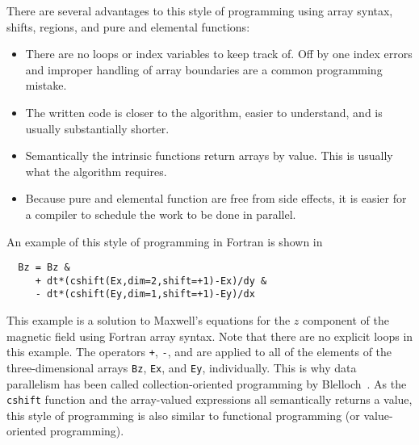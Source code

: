 

There are several advantages to this style of programming using array
syntax, shifts, regions, and pure and elemental functions:

\begin{itemize}
\item There are no loops or index variables to keep track of.  Off by
  one index errors and improper handling of array boundaries are a
  common programming mistake.
\item The written code is closer to the algorithm, easier to
  understand, and is usually substantially shorter.
\item Semantically the intrinsic functions return arrays by value.
  This is usually what the algorithm requires.
\item Because pure and elemental function are free from side effects,
  it is easier for a compiler to schedule the work to be done in
  parallel.
\end{itemize}


An example of this style of programming in Fortran is shown in

{\small
\begin{verbatim}
  Bz = Bz &
     + dt*(cshift(Ex,dim=2,shift=+1)-Ex)/dy &
     - dt*(cshift(Ey,dim=1,shift=+1)-Ey)/dx
\end{verbatim}
}


This example is a solution to Maxwell's equations for the $z$
component of the magnetic field using Fortran array syntax.  Note that
there are no explicit loops in this example.  The operators {\tt +},
{\tt -}, and {\tt *} are applied to all of the elements of the
three-dimensional arrays {\tt Bz}, {\tt Ex}, and {\tt Ey},
individually.  This is why data parallelism has been called
collection-oriented programming by
Blelloch~\cite{blelloch90,rajopadhye93}.  As the {\tt cshift}
function and the array-valued expressions all semantically returns a
value, this style of programming is also similar to functional
programming (or value-oriented
programming). 



